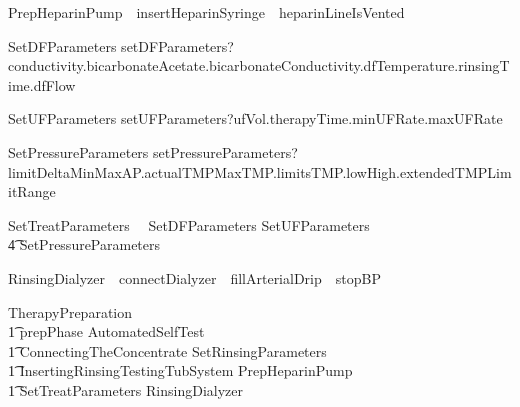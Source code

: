 \begin{circus}
  PrepHeparinPump~\circdef~insertHeparinSyringe~\then~heparinLineIsVented~\then~\Skip

  SetDFParameters \circdef
    setDFParameters?conductivity.bicarbonateAcetate.bicarbonateConductivity.dfTemperature.rinsingTime.dfFlow \then \Skip

  SetUFParameters \circdef
    setUFParameters?ufVol.therapyTime.minUFRate.maxUFRate \then \Skip

  SetPressureParameters \circdef
    setPressureParameters?limitDeltaMinMaxAP.actualTMPMaxTMP.limitsTMP.lowHigh.extendedTMPLimitRange \then \Skip


  SetTreatParameters~\circdef~ SetDFParameters \circseq SetUFParameters \circseq
  \\\t4 SetPressureParameters %

  RinsingDialyzer~\circdef~connectDialyzer~\then~fillArterialDrip~\then~stopBP~\then~\Skip

  TherapyPreparation~\circdef
    \\\t1 prepPhase \then AutomatedSelfTest \circseq
    \\\t1 ConnectingTheConcentrate \circseq SetRinsingParameters \circseq
    \\\t1 InsertingRinsingTestingTubSystem \circseq PrepHeparinPump \circseq
    \\\t1 SetTreatParameters \circseq RinsingDialyzer


\end{circus}
